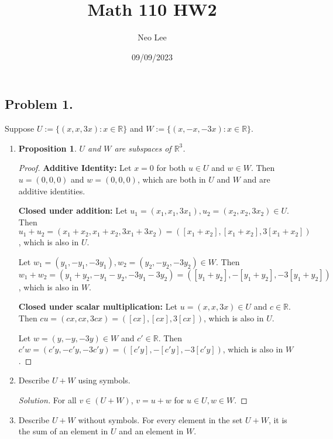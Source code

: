 \documentclass{article}
\title{Math 110 HW2}
\author{Neo Lee}
\date{09/09/2023}
\newtheorem{proposition}[thm]{Proposition}
\begin{document}
 

\maketitle 

\subsection*{Problem 1.}
Suppose $U:=\{(x,x,3x):x\in\mathbb{R}\}$ and $W:=\{(x,-x,-3x):x\in\mathbb{R}\}$. 
\begin{enumerate}[label=(\alph*)]
    \item \begin{proposition}
        $U$ and $W$ are subspaces of $\mathbb{R}^3$.
    \end{proposition}
    \begin{proof}
        
        \textbf{Additive Identity:}
        Let $x = 0$ for both $u\in U$ and $w\in W$. Then $u = (0,0,0)$ and $w = (0,0,0)$, which 
        are both in $U$ and $W$ and are additive identities.

        \textbf{Closed under addition:}
        Let $u_1 = (x_1, x_1, 3x_1), u_2 = (x_2, x_2, 3x_2)\in U$. Then $u_1+u_2 = (x_1+x_2, 
        x_1+x_2, 3x_1+3x_2) = ([x_1+x_2], [x_1+x_2], 3[x_1+x_2])$, which is also in $U$.

        Let $w_1 = (y_1, -y_1, -3y_1), w_2 = (y_2, -y_2, -3y_2)\in W$. Then $w_1+w_2 = (y_1+y_2, 
        -y_1-y_2, -3y_1-3y_2) = ([y_1+y_2], -[y_1+y_2], -3[y_1+y_2])$, which is also in $W$.

        \textbf{Closed under scalar multiplication:}
        Let $u = (x, x, 3x)\in U$ and $c\in\mathbb{R}$. Then $cu = (cx, cx, 3cx) = ([cx], [cx], 
        3[cx])$, which is also in $U$. 

        Let $w = (y, -y, -3y)\in W$ and $c'\in\mathbb{R}$. Then $c'w = (c'y, -c'y, -3c'y) = ([c'y], 
        -[c'y], -3[c'y])$, which is also in $W$.
    \end{proof}
    \item Describe $U+W$ using symbols.
    \begin{proof}[Solution]
        For all $v \in (U+W)$, $v = u + w$ for $u\in U, w\in W$.
    \end{proof}
    \item Describe $U+ W$ without symbols.
    For every element in the set $U+W$, it is the sum of an element in $U$ and an element in $W$.
\end{enumerate}
\end{document}
